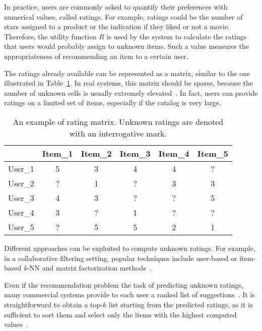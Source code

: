 In practice, users are commonly asked to quantify their preferences with numerical values, called ratings. For example, ratings could be the number of stars assigned to a product or the indication if they liked or not a movie. Therefore, the utility function $R$ is used by the system to calculate the ratings that users would probably assign to unknown items. Such a value measures the appropriateness of recommending an item to a certain user.

The ratings already available can be represented as a matrix, similar to the one illustrated in Table~\ref{soa:tab:ratings}. In real systems, this matrix should be sparse, because the number of unknown cells is usually extremely elevated~\cite{Ricci2015}. In fact, users can provide ratings on a limited set of items, especially if the catalog is very large.

\begin{table}
\centering
\begin{tabular}{@{}lccccc@{}}
\toprule
        & Item\_1 & Item\_2 & Item\_3 & Item\_4 & Item\_5 \\ \midrule
User\_1 & 5       & 3       & 4       & 4       & ?       \\
User\_2 & ?       & 1       & ?       & 3       & 3       \\
User\_3 & 4       & 3       & ?       & ?       & 5       \\
User\_4 & 3       & ?       & 1       & ?       & ?       \\
User\_5 & ?       & 5       & 5       & 2       & 1       \\ \bottomrule
\end{tabular}
\caption[Example of rating matrix]{An example of rating matrix. Unknown ratings are denoted with an interrogative mark.}
\label{soa:tab:ratings}
\end{table}

Different approaches can be exploited to compute unknown ratings. For example, in a collaborative filtering setting, popular techniques include user-based or item-based \textit{k}-NN and matrix factorization methods~\cite{Jannach2010}.

Even if the recommendation problem  the task of predicting unknown ratings, many commercial systems provide to each user a ranked list of suggestions~\cite{Lu2015}.  It is straightforward to obtain a top-$k$ list starting from the predicted ratings, as it is sufficient to sort them and select only the items with the highest computed values~\cite{Adomavicius2015}.

